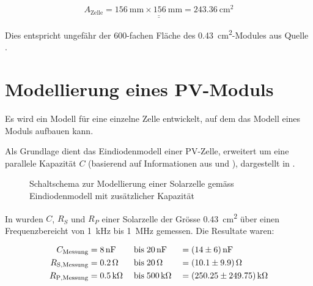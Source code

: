 \begin{equation}
    \label{eq:cell:surface}
    \underline{\underline{A_{\mathrm{Zelle}} = \SI{156}{\milli\meter} \times \SI{156}{\milli\meter} = \SI{243.36}{\centi\meter\squared}}}
\end{equation}

Dies     entspricht     ungef\"ahr     der     600-fachen     Fl\"ache     des
\SI{0.43}{\centi\meter\squared}-Modules aus  Quelle \cite{ref:solar:scofield}.


\section{Modellierung eines PV-Moduls}
\label{app:models:develop:module}

Es wird  ein Modell f\"ur eine  einzelne Zelle entwickelt, auf  dem das Modell
eines  Moduls  aufbauen  kann.

Als   Grundlage   dient   das  Eindiodenmodell   einer   PV-Zelle,   erweitert
um   eine  parallele   Kapazit\"at  $C$   (basierend  auf   Informationen  aus
\cite{ref:solar:scofield}   und   \cite{ref:solar:friesen}),  dargestellt   in
.

\begin{figure}[h!tb]
    \centering
    
    \caption{%
        Schaltschema    zur    Modellierung    einer    Solarzelle    gem\"ass
        Eindiodenmodell mit zus\"atzlicher Kapazit\"at%
    }
    \label{fig:circuit:solarCell}
\end{figure}

In \cite{ref:solar:scofield} wurden $C$,  $R_{S}$ und $R_{P}$ einer Solarzelle
der Gr\"osse \SI{0.43}{\centi\meter\squared} \"uber einen Frequenzbereicht von
\SI{1}{\kilo\hertz} bis \SI{1}{\mega\hertz} gemessen. Die Resultate waren:

\begin{alignat}{3}
    \label{eq:scofield:C}
    C_{\mathrm{Messung}}    &= \SI{8}{\nano\farad} \; & \text{bis} \; & \SI{20}{\nano\farad} \;  & = & \; \SI{14 \pm 6}{\nano\farad} \\
    \label{eq:scofield:Rs}
    R_{\mathrm{S, Messung}} &= \SI{0.2}{\ohm}      \; & \text{bis} \; & \SI{20}{\ohm}        \;  & = & \; \SI{10.1 \pm 9.9}{\ohm}     \\
    \label{eq:scofield:Rp}
    R_{\mathrm{P, Messung}} &= \SI{0.5}{\kilo\ohm} \; & \text{bis} \; & \SI{500}{\kilo\ohm}  \;  & = & \; \SI{250.25 \pm 249.75}{\kilo\ohm}
\end{alignat}

